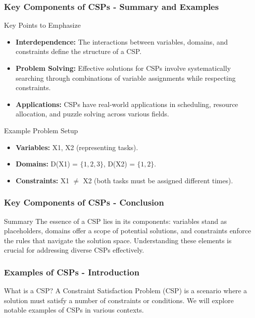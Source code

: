 \documentclass[aspectratio=169]{beamer}
\begin{document}
\begin{frame}[fragile]
  \frametitle{Key Components of CSPs - Summary and Examples}
  \begin{block}{Key Points to Emphasize}
    \begin{itemize}
      \item \textbf{Interdependence:} The interactions between variables, domains, and constraints define the structure of a CSP.
      \item \textbf{Problem Solving:} Effective solutions for CSPs involve systematically searching through combinations of variable assignments while respecting constraints.
      \item \textbf{Applications:} CSPs have real-world applications in scheduling, resource allocation, and puzzle solving across various fields.
    \end{itemize}
  \end{block}
  
  \begin{block}{Example Problem Setup}
    \begin{itemize}
      \item \textbf{Variables:} X1, X2 (representing tasks).
      \item \textbf{Domains:} D(X1) = $\{1, 2, 3\}$, D(X2) = $\{1, 2\}$.
      \item \textbf{Constraints:} X1 $\neq$ X2 (both tasks must be assigned different times).
    \end{itemize}
  \end{block}
\end{frame}

\begin{frame}[fragile]
  \frametitle{Key Components of CSPs - Conclusion}
  \begin{block}{Summary}
    The essence of a CSP lies in its components: variables stand as placeholders, domains offer a scope of potential solutions, and constraints enforce the rules that navigate the solution space. Understanding these elements is crucial for addressing diverse CSPs effectively.
  \end{block}
\end{frame}

\begin{frame}[fragile]
    \frametitle{Examples of CSPs - Introduction}
    \begin{block}{What is a CSP?}
        A Constraint Satisfaction Problem (CSP) is a scenario where a solution must satisfy a number of constraints or conditions. We will explore notable examples of CSPs in various contexts.
    \end{block}
\end{frame}
\end{document}
